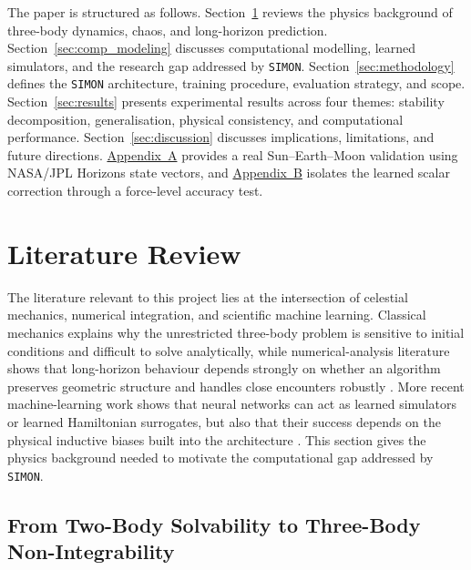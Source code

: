 \documentclass[12pt]{article}
\begin{document}
The paper is structured as follows.
Section~\ref{sec:lit_review} reviews the physics background of
three-body dynamics, chaos, and long-horizon prediction.
Section~\ref{sec:comp_modeling} discusses computational modelling,
learned simulators, and the research gap addressed by \texttt{SIMON}.
Section~\ref{sec:methodology} defines the \texttt{SIMON} architecture,
training procedure, evaluation strategy, and scope.
Section~\ref{sec:results} presents experimental results across four
themes: stability decomposition, generalisation, physical consistency,
and computational performance.
Section~\ref{sec:discussion} discusses implications, limitations, and
future directions.
\hyperref[app:real_system_validation]{Appendix~A} provides a real
Sun--Earth--Moon validation using NASA/JPL Horizons state vectors, and
\hyperref[app:force_level_nn_validation]{Appendix~B} isolates the
learned scalar correction through a force-level accuracy test.

\section{Literature Review}
\label{sec:lit_review}

The literature relevant to this project lies at the intersection of celestial mechanics,
numerical integration, and scientific machine learning. Classical mechanics explains why
the unrestricted three-body problem is sensitive to initial conditions and difficult to solve
analytically, while numerical-analysis literature shows that long-horizon behaviour depends
strongly on whether an algorithm preserves geometric structure and handles close encounters
robustly \cite{hairer2006geometric,Rein_2015,Rein_2014,boekholt2015reliability}. More recent
machine-learning work shows that neural networks can act as learned simulators or learned
Hamiltonian surrogates, but also that their success depends on the physical inductive biases
built into the architecture \cite{chen2018neuralode,battaglia2016interaction,greydanus2019hamiltonian,gruver2022deconstructing,horn2025generalized}. This section gives the physics background needed to motivate the computational gap addressed by \texttt{SIMON}.

\subsection{From Two-Body Solvability to Three-Body Non-Integrability}
\end{document}
